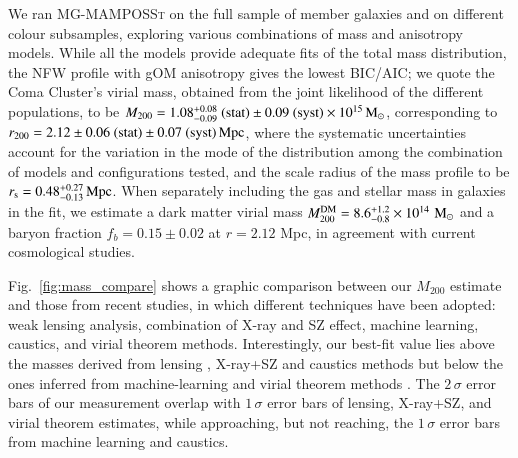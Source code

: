 \documentclass{aa}
\begin{document}
We ran \textsc{MG-MAMPOSSt} on the full sample of member galaxies and on different colour subsamples, exploring various combinations of mass and anisotropy models. While all the models provide adequate fits of the total mass distribution, the NFW profile  with gOM anisotropy gives the lowest BIC/AIC; we quote the Coma Cluster's virial mass, obtained from the joint likelihood of the different populations, to be $M_{200} = 1.08_{-0.09}^{+0.08}~({\rm stat}) \pm 0.09~({\rm syst}) \times 10^{15}  \, \mathrm{M_\odot}$, corresponding to $r_{200}=2.12 \pm 0.06~({\rm stat})\pm0.07~({\rm syst}) \, \mathrm{Mpc}$, where the systematic uncertainties account for the variation in the mode of the distribution among the combination of models and configurations tested, and the scale radius of the mass profile to be $r_{\rm s}=0.48_{-0.13}^{+0.27} \, \mathrm{Mpc}$. When separately including the gas and stellar mass in galaxies in the fit, we estimate a dark matter virial mass  $M_{200}^{\rm DM} = 8.6^{+1.2}_{-0.8}\times 10^{14}\, \,\text{M}_\odot$ and a baryon fraction $f_b = 0.15 \pm 0.02$ at $r = 2.12$ Mpc, in agreement with current cosmological studies.

Fig.~\ref{fig:mass_compare} shows a graphic comparison between our $M_{200}$ estimate and those from recent studies, in which different techniques have been adopted: weak lensing analysis, combination of X-ray and SZ effect, machine learning, caustics, and virial theorem methods. Interestingly, our best-fit value lies above the masses derived from lensing \citep{Gavazzi_2009, Cha_2025}, X-ray+SZ \citep{Mirakhor_2020} and caustics methods \citep{Benisty25} but below the ones inferred from machine-learning \citep{Ho_2022} and virial theorem methods \citep{Benisty25}. The $2\,\sigma$ error bars of our measurement overlap with $1\,\sigma$ error bars of lensing, X-ray+SZ, and virial theorem estimates, while approaching, but not reaching, the $1\,\sigma$ error bars from machine learning and caustics.
\end{document}
